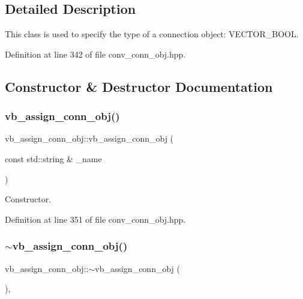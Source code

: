 \subsection{Detailed Description}
This class is used to specify the type of a connection object\+: V\+E\+C\+T\+O\+R\+\_\+\+B\+O\+OL. 

Definition at line 342 of file conv\+\_\+conn\+\_\+obj.\+hpp.



\subsection{Constructor \& Destructor Documentation}
\mbox{\label{classvb__assign__conn__obj_aba1a9d8092afaaaaeadcd04dd3a8a16a}} 
\subsubsection{\texorpdfstring{vb\+\_\+assign\+\_\+conn\+\_\+obj()}{vb\_assign\_conn\_obj()}}
{\footnotesize\ttfamily vb\+\_\+assign\+\_\+conn\+\_\+obj\+::vb\+\_\+assign\+\_\+conn\+\_\+obj (\begin{DoxyParamCaption}\item[{const std\+::string \&}]{\+\_\+name }\end{DoxyParamCaption})\hspace{0.3cm}{\ttfamily [inline]}}



Constructor. 



Definition at line 351 of file conv\+\_\+conn\+\_\+obj.\+hpp.

\mbox{\label{classvb__assign__conn__obj_ae07f248205d13dd22ba76694b766184a}} 
\subsubsection{\texorpdfstring{$\sim$vb\+\_\+assign\+\_\+conn\+\_\+obj()}{~vb\_assign\_conn\_obj()}}
{\footnotesize\ttfamily vb\+\_\+assign\+\_\+conn\+\_\+obj\+::$\sim$vb\+\_\+assign\+\_\+conn\+\_\+obj (\begin{DoxyParamCaption}{ }\end{DoxyParamCaption})\hspace{0.3cm}{\ttfamily [override]}, {\ttfamily [default]}}



